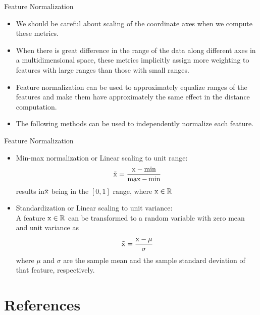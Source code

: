 \begin{frame}{Feature Normalization}
\begin{itemize}
\item We should be careful about scaling of the coordinate axes when we compute these metrics.
􏰂\item When there is great difference in the range of the data along different axes in a multidimensional space, these metrics implicitly assign more weighting to features with large ranges than those with small ranges.
􏰂\item {\color{mycolor2}Feature normalization} can be used to approximately equalize ranges of the features and make them have approximately the same effect in the distance computation.
􏰂\item The following methods can be used to independently normalize each feature.
\end{itemize}
\end{frame}

\begin{frame}{Feature Normalization}
\begin{itemize}
\item {\color{mycolor2}Min-max normalization} or Linear scaling to unit range:\\
\[\tilde{\rm x} = \frac{{{\rm x} - \min }}{{\max  - \min }}\]
results in$ \tilde{\rm x}$ being in the $[0,1]$ range, where ${\rm x}\in \mathbb{R}$
\item  {\color{mycolor2}Standardization} or Linear scaling to unit variance:\\
A feature ${\rm x}\in \mathbb{R}$ can be transformed to a random variable with zero mean and unit variance as
\[\tilde{\rm x} = \frac{{{\rm x} - \mu }}{\sigma }\]
where $\mu$ and $\sigma$ are the sample mean and the sample standard deviation of that feature, respectively.\nocite{duda2012pattern}\nocite{gose1997pattern}
\end{itemize}
\end{frame}





\section{References}
